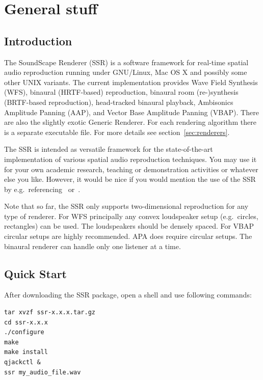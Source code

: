 \section{General stuff}

\subsection{Introduction}

The SoundScape Renderer (SSR) is a software framework for real-time spatial
audio reproduction running under GNU/Linux, Mac OS X and possibly some other UNIX
variants.
The current implementation provides Wave Field Synthesis (WFS),
binaural (HRTF-based) reproduction, binaural room (re-)synthesis (BRTF-based
reproduction), head-tracked binaural playback, Ambisonics Amplitude Panning 
(AAP), and Vector Base Amplitude Panning (VBAP).
There are also the slightly exotic Generic Renderer.
For each rendering algorithm there is a separate executable file.
For more details see section~\ref{sec:renderers}.

The SSR is intended as versatile framework for the state-of-the-art
implementation of various spatial audio reproduction techniques. You may use it
for your own academic research, teaching or demonstration activities or whatever
else you like.
However, it would be nice if you would mention the use of the SSR by
e.g.\ referencing~\cite{Geier08:AES} or~\cite{geier2012ssr}.

Note that so far, the SSR only supports two-dimensional reproduction for any
type of renderer. For WFS principally any convex loudspeaker setup
(e.g.\ circles, rectangles) can be used. The loudspeakers should be densely
spaced. For VBAP circular setups are highly recommended. APA does require
circular setups. The binaural renderer can handle only one listener at a time.

\subsection{Quick Start}
\label{sec:quick_start}

After downloading the SSR package, open a shell and use following commands:

\begin{verbatim}
tar xvzf ssr-x.x.x.tar.gz
cd ssr-x.x.x
./configure
make
make install
qjackctl &
ssr my_audio_file.wav
\end{verbatim}

